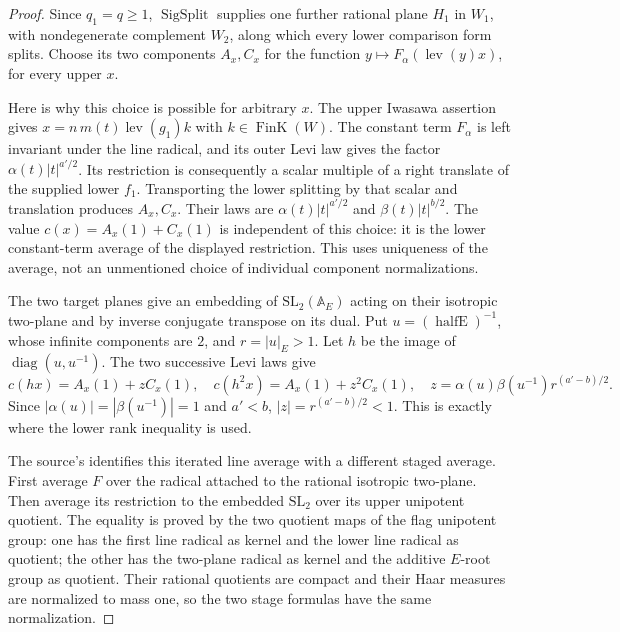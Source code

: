 \begin{proof}
Since \(q_1=q\ge1\), \(\operatorname{SigSplit}\) supplies one
further rational plane \(H_1\) in \(W_1\), with nondegenerate
complement \(W_2\), along which every lower comparison form
splits. Choose its two components \(A_x,C_x\) for the function
\(y\mapsto F_\alpha(\operatorname{lev}(y)x)\), for every upper \(x\).

Here is why this choice is possible for arbitrary \(x\).
The upper Iwasawa assertion gives
\(x=n\,m(t)\operatorname{lev}(g_1)k\) with
\(k\in\operatorname{FinK}(W)\).
The constant term \(F_\alpha\) is left invariant under
the line radical, and its outer Levi law gives the factor
\(\alpha(t)|t|^{a'/2}\).
Its restriction is consequently a scalar multiple of a
right translate of the supplied lower \(f_1\).
Transporting the lower splitting by that scalar and translation
produces \(A_x,C_x\).
Their laws are \(\alpha(t)|t|^{a'/2}\) and
\(\beta(t)|t|^{b/2}\).
The value \(c(x)=A_x(1)+C_x(1)\) is independent of this choice:
it is the lower constant-term average of the displayed
restriction. This uses uniqueness of the average, not
an unmentioned choice of individual component normalizations.

The two target planes give an embedding of
\(\mathrm{SL}_2(\mathbb A_E)\) acting on their isotropic
two-plane and by inverse conjugate transpose on its dual.
Put \(u=(\operatorname{halfE})^{-1}\), whose infinite components
are \(2\), and \(r=|u|_E>1\).
Let \(h\) be the image of \(\operatorname{diag}(u,u^{-1})\).
The two successive Levi laws give
\[
 c(hx)=A_x(1)+zC_x(1),\quad
 c(h^2x)=A_x(1)+z^2C_x(1),\quad
 z=\alpha(u)\beta(u^{-1})r^{(a'-b)/2}.
 \tag{S6}\label{eq:sr-source-two-step-recurrence}
\]
Since \(|\alpha(u)|=|\beta(u^{-1})|=1\) and \(a'<b\),
\(|z|=r^{(a'-b)/2}<1\).
This is exactly where the lower rank inequality is used.

The source's  identifies this
iterated line average with a different staged average.
First average \(F\) over the radical attached to the rational
isotropic two-plane. Then average its restriction to the
embedded \(\mathrm{SL}_2\) over its upper unipotent quotient.
The equality is proved by the two quotient maps of the
flag unipotent group: one has the first line radical as
kernel and the lower line radical as quotient; the other
has the two-plane radical as kernel and the additive
\(E\)-root group as quotient.
Their rational quotients are compact and their Haar measures
are normalized to mass one, so the two stage formulas have
the same normalization.


\end{proof}
